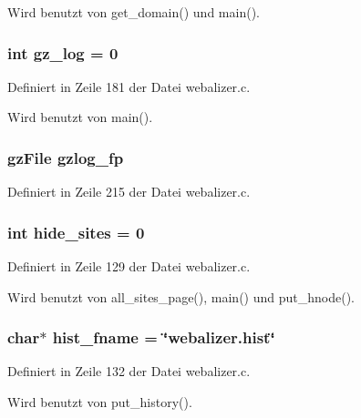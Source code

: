 Wird benutzt von get\_\-domain() und main().
\subsubsection{\setlength{\rightskip}{0pt plus 5cm}int {\bf gz\_\-log} = 0}\label{webalizer_8c_480128e1291f32b04678ddac9dc69457}




Definiert in Zeile 181 der Datei webalizer.c.

Wird benutzt von main().
\subsubsection{\setlength{\rightskip}{0pt plus 5cm}gz\-File {\bf gzlog\_\-fp}}\label{webalizer_8c_96781ba6a30d70f2b7f56fb409a3da01}




Definiert in Zeile 215 der Datei webalizer.c.
\subsubsection{\setlength{\rightskip}{0pt plus 5cm}int {\bf hide\_\-sites} = 0}\label{webalizer_8c_a77fbf13eba0ffbb98b893c0089cb49b}




Definiert in Zeile 129 der Datei webalizer.c.

Wird benutzt von all\_\-sites\_\-page(), main() und put\_\-hnode().
\subsubsection{\setlength{\rightskip}{0pt plus 5cm}char$\ast$ {\bf hist\_\-fname} = \char`\"{}webalizer.hist\char`\"{}}\label{webalizer_8c_196026e726faa9db510409f5d895d7a3}




Definiert in Zeile 132 der Datei webalizer.c.

Wird benutzt von put\_\-history().

